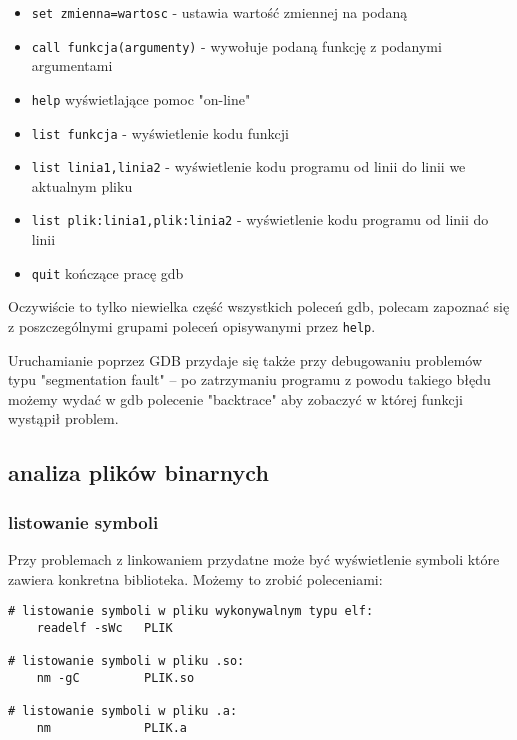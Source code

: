 \begin{itemize}
	\item\Verb$set zmienna=wartosc$ - ustawia wartość zmiennej na podaną
	\item\Verb$call funkcja(argumenty)$ - wywołuje podaną funkcję z podanymi argumentami
\vspace{6pt}
	\item\Verb$help$ wyświetlające pomoc "on-line"
	\item\Verb$list funkcja$ - wyświetlenie kodu funkcji
	\item\Verb$list linia1,linia2$ - wyświetlenie kodu programu od linii do linii we aktualnym pliku
	\item\Verb$list plik:linia1,plik:linia2$ - wyświetlenie kodu programu od linii do linii
	\item\Verb$quit$ kończące pracę gdb
\end{itemize}

Oczywiście to tylko niewielka część wszystkich poleceń gdb, polecam zapoznać się z poszczególnymi grupami poleceń opisywanymi przez \Verb$help$.

Uruchamianie poprzez GDB przydaje się także przy debugowaniu problemów typu "segmentation fault" – po zatrzymaniu programu z powodu takiego błędu możemy wydać w gdb polecenie "backtrace" aby zobaczyć w której funkcji wystąpił problem.

\subsection{analiza plików binarnych}

\subsubsection{listowanie symboli}

Przy problemach z linkowaniem przydatne może być wyświetlenie symboli które zawiera konkretna biblioteka. Możemy to zrobić poleceniami:

\begin{Verbatim}
# listowanie symboli w pliku wykonywalnym typu elf:
	readelf -sWc   PLIK

# listowanie symboli w pliku .so:
	nm -gC         PLIK.so

# listowanie symboli w pliku .a:
	nm             PLIK.a
\end{Verbatim}
